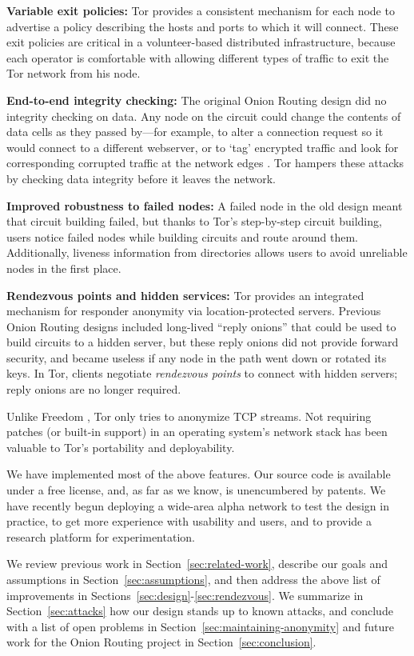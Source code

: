 \documentclass[times,10pt,twocolumn]{article}
\begin{document}
\textbf{Variable exit policies:} Tor provides a consistent mechanism
for each node to advertise a policy describing the hosts
and ports to which it will connect. These exit policies are critical
in a volunteer-based distributed infrastructure, because each operator
is comfortable with allowing different types of traffic to exit the Tor
network from his node.

\textbf{End-to-end integrity checking:} The original Onion Routing
design did no integrity checking on data. Any node on the
circuit could change the contents of data cells as they passed by---for
example, to alter a connection request so it would connect
to a different webserver, or to `tag' encrypted traffic and look for
corresponding corrupted traffic at the network edges \cite{minion-design}.
Tor hampers these attacks by checking data integrity before it leaves
the network.

\textbf{Improved robustness to failed nodes:} A failed node
in the old design meant that circuit building failed, but thanks to
Tor's step-by-step circuit building, users notice failed nodes
while building circuits and route around them. Additionally, liveness
information from directories allows users to avoid unreliable nodes in
the first place.

\textbf{Rendezvous points and hidden services:}
Tor provides an integrated mechanism for responder anonymity via
location-protected servers.  Previous Onion Routing designs included
long-lived ``reply onions'' that could be used to build circuits
to a hidden server, but these reply onions did not provide forward
security, and became useless if any node in the path went down
or rotated its keys.  In Tor, clients negotiate {\it rendezvous points}
to connect with hidden servers; reply onions are no longer required.


Unlike Freedom \cite{freedom2-arch}, Tor only tries to anonymize
TCP streams. Not requiring patches (or built-in support) in an
operating system's network stack has been valuable to Tor's
portability and deployability.

We have implemented most of the above features. Our source code is
available under a free license, and, as far as we know, is unencumbered by
patents. We have recently begun deploying a wide-area alpha network
to test the design in practice, to get more experience with usability
and users, and to provide a research platform for experimentation.

We review previous work in Section~\ref{sec:related-work}, describe
our goals and assumptions in Section~\ref{sec:assumptions},
and then address the above list of improvements in
Sections~\ref{sec:design}-\ref{sec:rendezvous}. We summarize
in Section~\ref{sec:attacks} how our design stands up to
known attacks, and conclude with a list of open problems in
Section~\ref{sec:maintaining-anonymity} and future work for the Onion
Routing project in Section~\ref{sec:conclusion}.
\end{document}
